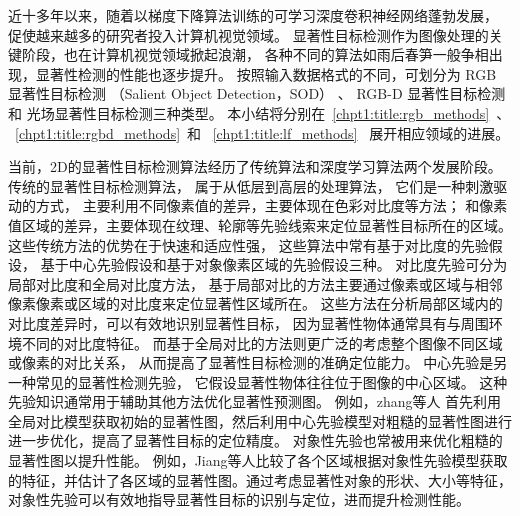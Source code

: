 


近十多年以来，随着以梯度下降算法训练的可学习深度卷积神经网络蓬勃发展，
促使越来越多的研究者投入计算机视觉领域。
显著性目标检测作为图像处理的关键阶段，也在计算机视觉领域掀起浪潮，
各种不同的算法如雨后春笋一般争相出现，显著性检测的性能也逐步提升。
按照输入数据格式的不同，可划分为
RGB 显著性目标检测
（Salient Object Detection，SOD）
、
RGB-D 显著性目标检测和
光场显著性目标检测三种类型。
本小结将分别在~\ref{chpt1:title:rgb_methods}~、
~\ref{chpt1:title:rgbd_methods}~和
~\ref{chpt1:title:lf_methods}~
展开相应领域的进展。



\label{chpt1:title:rgb_methods}


当前，2D的显著性目标检测算法经历了传统算法和深度学习算法两个发展阶段。
传统的显著性目标检测算法，
属于从低层到高层的处理算法，
它们是一种刺激驱动的方式，
主要利用不同像素值的差异，主要体现在色彩对比度等方法；
和像素值区域的差异，主要体现在纹理、轮廓等先验线索来定位显著性目标所在的区域。
这些传统方法的优势在于快速和适应性强，
这些算法中常有基于对比度的先验假设，
基于中心先验假设和基于对象像素区域的先验假设三种。
对比度先验可分为局部对比度和全局对比度方法，
基于局部对比的方法主要通过像素或区域与相邻像素像素或区域的对比度来定位显著性区域所在。
这些方法在分析局部区域内的对比度差异时，可以有效地识别显著性目标，
因为显著性物体通常具有与周围环境不同的对比度特征。
而基于全局对比的方法则更广泛的考虑整个图像不同区域或像素的对比关系，
从而提高了显著性目标检测的准确定位能力。
中心先验是另一种常见的显著性检测先验，
它假设显著性物体往往位于图像的中心区域。
这种先验知识通常用于辅助其他方法优化显著性预测图。
例如，zhang等人
首先利用全局对比模型获取初始的显著性图，然后利用中心先验模型对粗糙的显著性图进行进一步优化，提高了显著性目标的定位精度。
对象性先验也常被用来优化粗糙的显著性图以提升性能。
例如，Jiang等人比较了各个区域根据对象性先验模型获取的特征，并估计了各区域的显著性图。通过考虑显著性对象的形状、大小等特征，对象性先验可以有效地指导显著性目标的识别与定位，进而提升检测性能。



